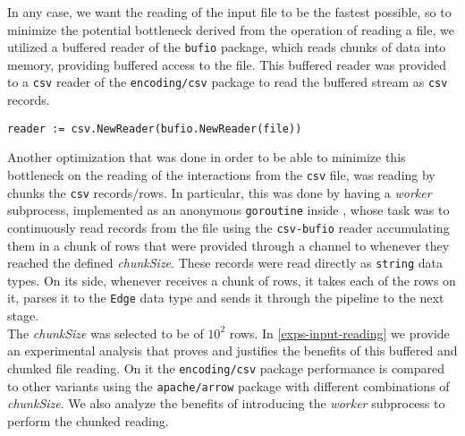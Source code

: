 In any case, we want the reading of the input file to be the fastest possible, so to minimize the potential bottleneck derived from the operation of reading a file, we utilized a buffered reader of the \texttt{bufio} package, which reads chunks of data into memory, providing buffered access to the file. This buffered reader was provided to a \texttt{csv} reader of the \texttt{encoding/csv} package to read the buffered stream as \texttt{csv} records.

    \begin{center}
    \lstset{style=golangStyle}
    \begin{lstlisting}[caption={\texttt{csv-bufio} reader}]
        reader := csv.NewReader(bufio.NewReader(file))
    \end{lstlisting}
    \end{center}
    
Another optimization that was done in order to be able to minimize this bottleneck on the reading of the interactions from the \texttt{csv} file, was reading by chunks the \texttt{csv} records/rows. In particular, this was done by having a \textit{worker} subprocess, implemented as an anonymous \texttt{goroutine} inside \Sr, whose task was to continuously read records from the file using the \texttt{csv-bufio} reader accumulating them in a chunk of rows that were provided through a channel to \Sr whenever they reached the defined \emph{chunkSize}. These records were read directly as \texttt{string} data types. On its side, whenever \Sr receives a chunk of rows, it takes each of the rows on it, parses it to the \texttt{Edge} data type and sends it through the pipeline to the next stage.\\

The \emph{chunkSize} was selected to be of $10^2$ rows. In \ref{exps-input-reading} we provide an experimental analysis that proves and justifies the benefits of this buffered and chunked file reading. On it the \texttt{encoding/csv} package performance is compared to other variants using the \texttt{apache/arrow} package with different combinations of \emph{chunkSize}. We also analyze the benefits of introducing the \textit{worker} subprocess to perform the chunked reading.








